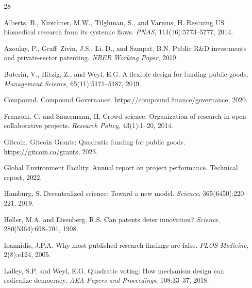 \documentclass[11pt,letterpaper]{article}
\begin{document}
\begin{thebibliography}{28}

Alberts, B., Kirschner, M.W., Tilghman, S., and Varmus, H.
\newblock Rescuing US biomedical research from its systemic flaws.
\newblock \emph{PNAS}, 111(16):5773--5777, 2014.

Azoulay, P., Graff~Zivin, J.S., Li, D., and Sampat, B.N.
\newblock Public R\&D investments and private-sector patenting.
\newblock \emph{NBER Working Paper}, 2019.

Buterin, V., Hitzig, Z., and Weyl, E.G.
\newblock A flexible design for funding public goods.
\newblock \emph{Management Science}, 65(11):5171--5187, 2019.

Compound.
\newblock Compound Governance.
\newblock \url{https://compound.finance/governance}, 2020.

Franzoni, C. and Sauermann, H.
\newblock Crowd science: Organization of research in open collaborative projects.
\newblock \emph{Research Policy}, 43(1):1--20, 2014.

Gitcoin.
\newblock Gitcoin Grants: Quadratic funding for public goods.
\newblock \url{https://gitcoin.co/grants}, 2023.

Global Environment Facility.
\newblock Annual report on project performance.
\newblock Technical report, 2022.

Hamburg, S.
\newblock Decentralized science: Toward a new model.
\newblock \emph{Science}, 365(6450):220--221, 2019.

Heller, M.A. and Eisenberg, R.S.
\newblock Can patents deter innovation?
\newblock \emph{Science}, 280(5364):698--701, 1998.

Ioannidis, J.P.A.
\newblock Why most published research findings are false.
\newblock \emph{PLOS Medicine}, 2(8):e124, 2005.

Lalley, S.P. and Weyl, E.G.
\newblock Quadratic voting: How mechanism design can radicalize democracy.
\newblock \emph{AEA Papers and Proceedings}, 108:33--37, 2018.


\end{thebibliography}
\end{document}
